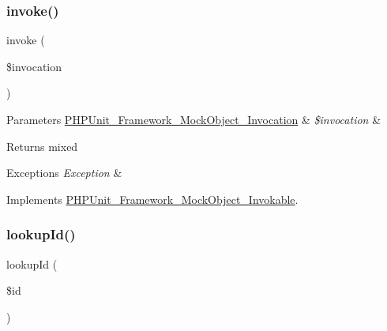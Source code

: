 \subsubsection{\texorpdfstring{invoke()}{invoke()}}
{\footnotesize\ttfamily invoke (\begin{DoxyParamCaption}\item[{\mbox{\hyperlink{interface_p_h_p_unit___framework___mock_object___invocation}{P\+H\+P\+Unit\+\_\+\+Framework\+\_\+\+Mock\+Object\+\_\+\+Invocation}}}]{\$invocation }\end{DoxyParamCaption})}


\begin{DoxyParams}[1]{Parameters}
\mbox{\hyperlink{interface_p_h_p_unit___framework___mock_object___invocation}{P\+H\+P\+Unit\+\_\+\+Framework\+\_\+\+Mock\+Object\+\_\+\+Invocation}} & {\em \$invocation} & \\
\hline
\end{DoxyParams}
\begin{DoxyReturn}{Returns}
mixed
\end{DoxyReturn}

\begin{DoxyExceptions}{Exceptions}
{\em Exception} & \\
\hline
\end{DoxyExceptions}


Implements \mbox{\hyperlink{interface_p_h_p_unit___framework___mock_object___invokable_af2fc26e6704e08d95f2ea1d9c5ffb865}{P\+H\+P\+Unit\+\_\+\+Framework\+\_\+\+Mock\+Object\+\_\+\+Invokable}}.

\mbox{\label{class_p_h_p_unit___framework___mock_object___invocation_mocker_a1618f99693f7303270b2c569fdd602d4}} 
\subsubsection{\texorpdfstring{lookup\+Id()}{lookupId()}}
{\footnotesize\ttfamily lookup\+Id (\begin{DoxyParamCaption}\item[{}]{\$id }\end{DoxyParamCaption})}


